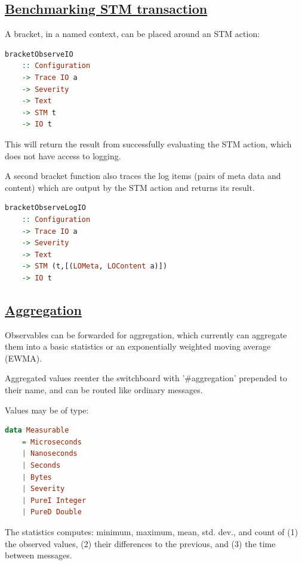 \begin{mdframed}

    \section*{\href{https://github.com/input-output-hk/iohk-monitoring-framework/blob/master/iohk-monitoring/src/Cardano/BM/Observer/STM.lhs}{Benchmarking STM transaction}}

A bracket, in a named context, can be placed around an STM action:

    \begin{lstlisting}[language=Haskell]
bracketObserveIO
    :: Configuration
    -> Trace IO a
    -> Severity
    -> Text
    -> STM t
    -> IO t
    \end{lstlisting}

This will return the result from successfully evaluating the STM action, which does not have access to logging.

A second bracket function also traces the log items (pairs of meta data and content) which are output by the STM action and returns its result.

    \begin{lstlisting}[language=Haskell]
bracketObserveLogIO
    :: Configuration
    -> Trace IO a
    -> Severity
    -> Text
    -> STM (t,[(LOMeta, LOContent a)])
    -> IO t
    \end{lstlisting}
\end{mdframed}

\begin{mdframed}

    \section*{\href{https://github.com/input-output-hk/iohk-monitoring-framework/blob/master/iohk-monitoring/src/Cardano/BM/Data/Aggregated.lhs}{Aggregation}}

Observables can be forwarded for aggregation, which currently can aggregate them into a basic statistics or an exponentially weighted moving average (EWMA).

Aggregated values reenter the switchboard with '\#aggregation' prepended to their name, and can be routed like ordinary messages.

Values may be of type:

    \begin{lstlisting}[language=Haskell]
data Measurable
    = Microseconds
    | Nanoseconds
    | Seconds
    | Bytes
    | Severity
    | PureI Integer
    | PureD Double
    \end{lstlisting}

The statistics computes: minimum, maximum, mean, std. dev., and count of (1) the observed values, (2) their differences to the previous, and (3) the time between messages.
\end{mdframed}

